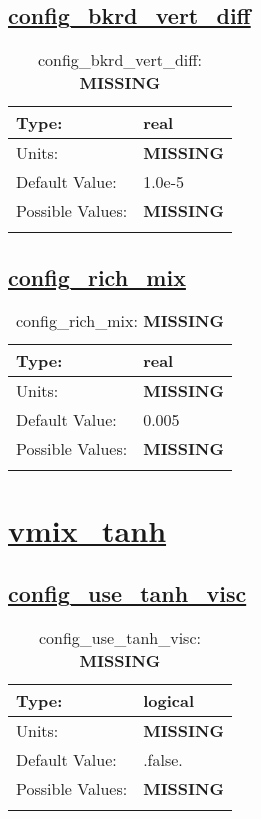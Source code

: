 \subsection[config\_bkrd\_vert\_diff]{\hyperref[sec:nm_tab_vmix_rich]{config\_bkrd\_vert\_diff}}
\label{subsec:nm_sec_config_bkrd_vert_diff}
\begin{center}
\begin{longtable}{| p{2.0in} | p{4.0in} |}
    \hline
    Type: & real \\
    \hline
    Units: & {\bf \color{red} MISSING} \\
    \hline
    Default Value: & 1.0e-5 \\
    \hline
    Possible Values: & {\bf \color{red} MISSING} \\
    \hline
    \caption{config\_bkrd\_vert\_diff: {\bf \color{red} MISSING}}
\end{longtable}
\end{center}
\subsection[config\_rich\_mix]{\hyperref[sec:nm_tab_vmix_rich]{config\_rich\_mix}}
\label{subsec:nm_sec_config_rich_mix}
\begin{center}
\begin{longtable}{| p{2.0in} | p{4.0in} |}
    \hline
    Type: & real \\
    \hline
    Units: & {\bf \color{red} MISSING} \\
    \hline
    Default Value: & 0.005 \\
    \hline
    Possible Values: & {\bf \color{red} MISSING} \\
    \hline
    \caption{config\_rich\_mix: {\bf \color{red} MISSING}}
\end{longtable}
\end{center}
\section[vmix\_tanh]{\hyperref[sec:nm_tab_vmix_tanh]{vmix\_tanh}}
\label{sec:nm_sec_vmix_tanh}
\subsection[config\_use\_tanh\_visc]{\hyperref[sec:nm_tab_vmix_tanh]{config\_use\_tanh\_visc}}
\label{subsec:nm_sec_config_use_tanh_visc}
\begin{center}
\begin{longtable}{| p{2.0in} | p{4.0in} |}
    \hline
    Type: & logical \\
    \hline
    Units: & {\bf \color{red} MISSING} \\
    \hline
    Default Value: & .false. \\
    \hline
    Possible Values: & {\bf \color{red} MISSING} \\
    \hline
    \caption{config\_use\_tanh\_visc: {\bf \color{red} MISSING}}
\end{longtable}
\end{center}
